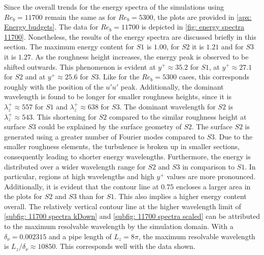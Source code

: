 Since the overall trends for the energy spectra of the simulations using $Re_b = 11700$ remain the same as for $Re_b = 5300$, the plots are provided in \autoref{apx: Energy budgets}. 
The data for $Re_b = 11700$ is depicted in \autoref{fig: energy spectra 11700}.
Nonetheless, the results of the energy spectra are discussed briefly in this section.
The maximum energy content for $S1$ is $1.00$, for $S2$ it is $1.21$ and for $S3$ it is $1.27$.
As the roughness height increases, the energy peak is observed to be shifted outwards.
This phenomenon is evident at $y^+ \approx 35.2$ for $S1$, at $y^+ \approx 27.1$ for $S2$ and at $y^+ \approx 25.6$ for $S3$.
Like for the $Re_b = 5300$ cases, this corresponds roughly with the position of the $u'u'$ peak.
Additionally, the dominant wavelength is found to be longer for smaller roughness heights, since it is $\lambda_z^+ \approx 557$ for $S1$ and $\lambda_z^+ \approx 638$ for $S3$.
The dominant wavelength for $S2$ is $\lambda_z^+ \approx 543$.
This shortening for $S2$ compared to the similar roughness height at surface $S3$ could be explained by the surface geometry of $S2$.
The surface $S2$ is generated using a greater number of  Fourier modes compared to $S3$.
Due to the smaller roughness elements, the turbulence is broken up in smaller  sections, consequently leading to shorter energy wavelengths.
Furthermore, the energy is distributed over a wider wavelength range for $S2$ and $S3$ in comparison to $S1$.
In particular, regions at high wavelengths and high $y^+$ values are more pronounced.
Additionally, it is evident that the contour line at $0.75$ encloses a larger area in the plots for $S2$ and $S3$ than for $S1$.
This also implies a higher energy content overall.
The relatively vertical contour line at the higher wavelength limit of \autoref{subfig: 11700 spectra kDown} and \autoref{subfig: 11700 spectra scaled} can be attributed to the maximum resolvable wavelength by the simulation domain.
With a $\delta_\nu = 0.002315$ and a pipe length of $L_z = 8\pi$, the maximum resolvable wavelength is $L_z / \delta_\nu \approx 10850$.
This corresponds well with the data shown.

